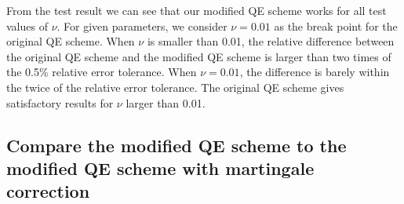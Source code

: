 \documentclass{ws-ijfe}
\begin{document}
From the test result we can see that our modified QE scheme works for all test values of $\nu$. For given parameters, we consider $\nu=0.01$ as the break point for the original QE scheme. When $\nu$ is smaller than 0.01, the relative difference between the original QE scheme and the modified QE scheme is larger than two times of the 0.5\% relative error tolerance. When $\nu=0.01$, the difference is barely within the twice of the relative error tolerance. The original QE scheme gives satisfactory results for $\nu$ larger than 0.01.

\subsection{Compare the modified QE scheme to the modified QE scheme with martingale correction}
\end{document}
